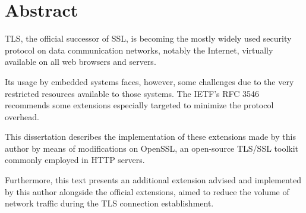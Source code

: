 
\chapter*{Abstract}

\begin{center}

{\Large\bfseries \pfcTituloEN}

\end{center}

TLS, the official successor of SSL, is becoming the mostly widely used security protocol on data communication networks, notably the Internet, virtually available on all web browsers and servers.

Its usage by embedded systems faces, however, some challenges due to the very restricted resources available to those systems. The IETF's RFC 3546 recommends some extensions especially targeted to minimize the protocol overhead.

This dissertation describes the implementation of these extensions made by this author by means of modifications on OpenSSL, an open-source TLS/SSL toolkit commonly employed in HTTP servers.

Furthermore, this text presents an additional extension advised and implemented by this author alongside the official extensions, aimed to reduce the volume of network traffic during the TLS connection establishment.
